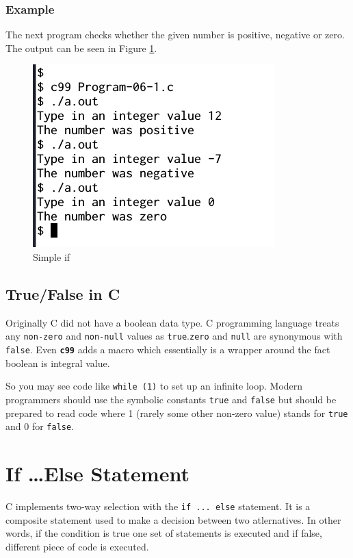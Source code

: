 \documentclass[11pt,a4paper]{article}
\begin{document}
\subsubsection*{Example} 
The next program checks whether the given number is positive, negative or zero. The output can be seen in Figure \ref{output-06-1}.



\begin{figure}[ht]
\begin{center}
\includegraphics[scale=0.6]{Output-06-1.png}
\caption{Simple if}
\label{output-06-1}
\end{center}
\end{figure}

\subsection*{True/False in C}
Originally C did not have a boolean data type. C programming language treats any \texttt{non-zero} and \texttt{non-null} values as \texttt{true}.\texttt{zero} and \texttt{null}  are synonymous with \texttt{false}. Even \textbf{\texttt{c99}} adds a macro which essentially is a wrapper around the fact boolean is integral value.

So you may see code like \lstinline!while (1)! to set up an infinite loop. Modern programmers should use the symbolic constants \texttt{true} and \texttt{false} but should be prepared to read code where 1 (rarely some other non-zero value) stands for \texttt{true} and 0 for \texttt{false}.

\section*{If \ldots Else Statement}
C implements two-way selection with the \lstinline!if ... else! statement. It is a composite statement used to make a decision between two atlernatives. In other words, if the condition is true one set of statements is executed and if false, different piece of code is executed.
\end{document}
